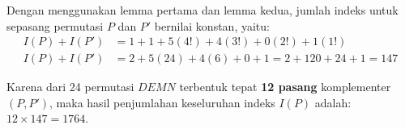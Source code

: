 \begin{solusi}
    Dengan menggunakan lemma pertama dan lemma kedua, jumlah indeks untuk sepasang permutasi $P$ dan $P'$ bernilai konstan, yaitu:
    \begin{align*}
    I(P) + I(P') &= 1 + 1 + 5(4!) + 4(3!) + 0(2!) + 1(1!)\\
    I(P) + I(P') &= 2 + 5(24) + 4(6) + 0 + 1 = 2 + 120 + 24 + 1 = 147 
    \end{align*}

    Karena dari 24 permutasi $DEMN$ terbentuk tepat \textbf{12 pasang} komplementer $(P, P')$, maka hasil penjumlahan keseluruhan indeks $I(P)$ adalah:
    $12 \times 147 = \boxed{1764}$.
\end{solusi}

